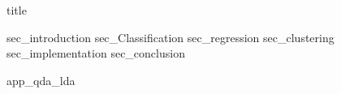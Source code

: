 \documentclass[12pt, a4paper]{article}
\begin{document}
{title}
\newpage
\tableofcontents
\newpage
\listoffigures
{sec_introduction}
{sec_Classification}
{sec_regression}
{sec_clustering}
{sec_implementation}
{sec_conclusion}
\newpage


\appendix
{app_qda_lda}
\end{document}
